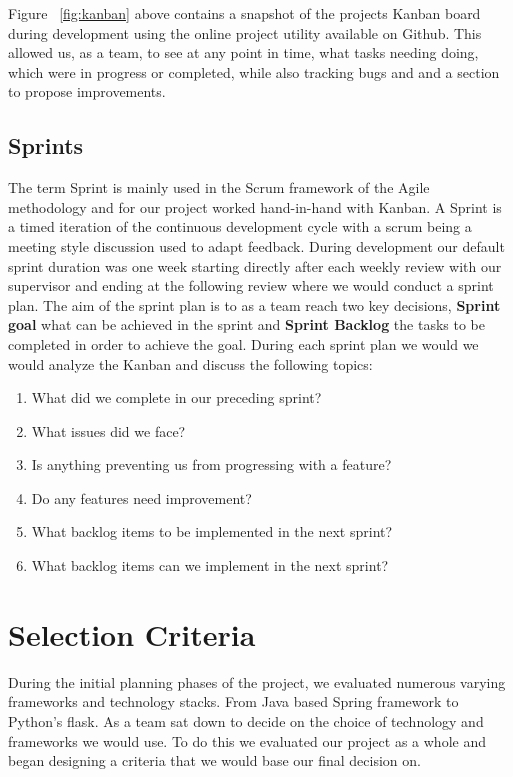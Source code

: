 Figure  ~\ref{fig:kanban} above contains a snapshot of the projects Kanban board during development using the online project utility available on Github. This allowed us, as a team, to see at any point in time, what tasks needing doing, which were in progress or completed, while also tracking bugs and and a section to propose improvements.

\subsection{Sprints}
The term Sprint is mainly used in the Scrum framework of the Agile methodology and for our project worked hand-in-hand with Kanban. A Sprint is a timed iteration of the continuous development cycle with a scrum being a meeting style discussion used to adapt feedback. During development our default sprint duration was one week starting directly after each weekly review with our supervisor and ending at the following review where we would conduct a sprint plan. The aim of the sprint plan is to as a team reach two key decisions, \textbf{Sprint goal} what can be achieved in the sprint and \textbf{Sprint Backlog} the tasks to be completed in order to achieve the goal. During each sprint plan we would we would analyze the Kanban and discuss the following topics:

\begin{enumerate}
  \item What did we complete in our preceding sprint?
  \item What issues did we face?
  \item Is anything preventing us from progressing with a feature?
  \item Do any features need improvement?
  \item What backlog items to be implemented in the next sprint?
  \item What backlog items can we implement in the next sprint?
\end{enumerate}

\section{Selection Criteria}
During the initial planning phases of the project, we evaluated numerous varying frameworks and technology stacks. From Java based Spring framework to Python's flask. As a team sat down to decide on the choice of technology and frameworks we would use. To do this we evaluated our project as a whole and began designing a criteria that we would base our final decision on. 

